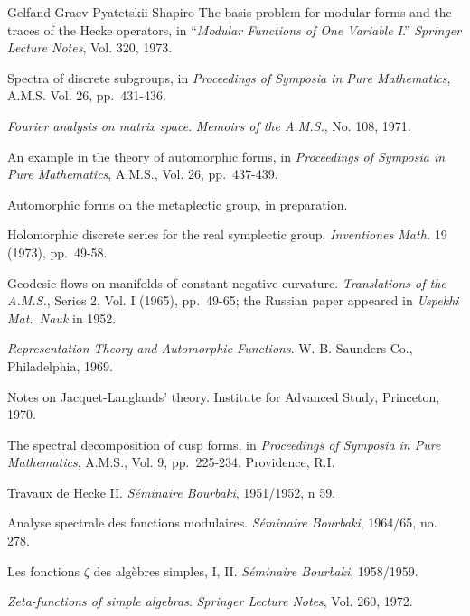 \begin{thebibliography}{Gelfand-Graev-Pyatetskii-Shapiro}
 The basis problem for modular forms and the traces of the Hecke operators, in ``\emph{Modular Functions of One Variable I}.'' \emph{Springer Lecture Notes}, Vol. 320, 1973.

 Spectra of discrete subgroups, in \emph{Proceedings of Symposia in Pure Mathematics}, A.M.S. Vol. 26, pp.\ 431-436.

 \emph{Fourier analysis on matrix space}. \emph{Memoirs of the A.M.S.}, No. 108, 1971.

 An example in the theory of automorphic forms, in \emph{Proceedings of Symposia in Pure Mathematics}, A.M.S., Vol. 26, pp.\ 437-439.

 Automorphic forms on the metaplectic group, in preparation.

 Holomorphic discrete series for the real symplectic group. \emph{Inventiones Math.} 19 (1973), pp.\ 49-58.

 Geodesic flows on manifolds of constant negative curvature. \emph{Translations of the A.M.S.}, Series 2, Vol. I (1965), pp.\ 49-65; the Russian paper appeared in \emph{Uspekhi Mat.\ Nauk} in 1952.

 \emph{Representation Theory and Automorphic Functions}. W. B. Saunders Co., Philadelphia, 1969.

 Notes on Jacquet-Langlands' theory. Institute for Advanced Study, Princeton, 1970.

 The spectral decomposition of cusp forms, in \emph{Proceedings of Symposia in Pure Mathematics}, A.M.S., Vol. 9, pp.\ 225-234. Providence, R.I.

 Travaux de Hecke II. \emph{S\'eminaire Bourbaki}, 1951/1952, n\textdegree{} 59.

 Analyse spectrale des fonctions modulaires. \emph{S\'eminaire Bourbaki}, 1964/65, no. 278.

 Les fonctions $\zeta$ des alg\`ebres simples, I, II. \emph{S\'eminaire Bourbaki}, 1958/1959.

 \emph{Zeta-functions of simple algebras}. \emph{Springer Lecture Notes}, Vol. 260, 1972.


\end{thebibliography}
